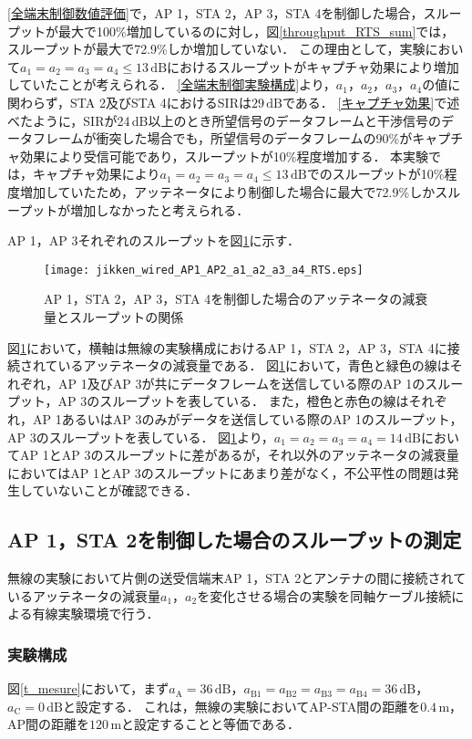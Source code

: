 \documentclass[master]{kuisthesis}		%
\begin{document}
\ref{全端末制御数値評価}で，AP 1，STA 2，AP 3，STA 4を制御した場合，スループットが最大で100\%増加しているのに対し，図\ref{throughput_RTS_sum}では，スループットが最大で72.9\%しか増加していない．
この理由として，実験において$a_1 = a_2 = a_3 = a_4 \leq 13\,\mathrm{dB}$におけるスループットがキャプチャ効果により増加していたことが考えられる．
\ref{全端末制御実験構成}より，$a_1$，$a_2$，$a_3$，$a_4$の値に関わらず，STA 2及びSTA 4におけるSIRは$29\,\mathrm{dB}$である．
\ref{キャプチャ効果}で述べたように，SIRが24\,dB以上のとき所望信号のデータフレームと干渉信号のデータフレームが衝突した場合でも，所望信号のデータフレームの90\%がキャプチャ効果により受信可能であり，スループットが10\%程度増加する．
本実験では，キャプチャ効果により$a_1 = a_2 = a_3 = a_4 \leq 13\,\mathrm{dB}$でのスループットが10\%程度増加していたため，アッテネータにより制御した場合に最大で72.9\%しかスループットが増加しなかったと考えられる．

AP 1，AP 3それぞれのスループットを図\ref{throughput_RTS}に示す．
\ifnum {}
\begin{figure}[!t]
\centering
\texttt{[image: jikken\_wired\_AP1\_AP2\_a1\_a2\_a3\_a4\_RTS.eps]}
\caption{AP 1，STA 2，AP 3，STA 4を制御した場合のアッテネータの減衰量とスループットの関係}
\label{throughput_RTS}
\end{figure}
\fi
図\ref{throughput_RTS}において，横軸は無線の実験構成におけるAP 1，STA 2，AP 3，STA 4に接続されているアッテネータの減衰量である．
図\ref{throughput_RTS}において，青色と緑色の線はそれぞれ，AP 1及びAP 3が共にデータフレームを送信している際のAP 1のスループット，AP 3のスループットを表している．
また，橙色と赤色の線はそれぞれ，AP 1あるいはAP 3のみがデータを送信している際のAP 1のスループット，AP 3のスループットを表している．
図\ref{throughput_RTS}より，$a_1 = a_2 = a_3 = a_4 = 14\,\mathrm{dB}$においてAP 1とAP 3のスループットに差があるが，それ以外のアッテネータの減衰量においてはAP 1とAP 3のスループットにあまり差がなく，不公平性の問題は発生していないことが確認できる．

\subsection{AP 1，STA 2を制御した場合のスループットの測定}\label{AP1，STA 2制御}
無線の実験において片側の送受信端末AP 1，STA 2とアンテナの間に接続されているアッテネータの減衰量$a_1$，$a_2$を変化させる場合の実験を同軸ケーブル接続による有線実験環境で行う．
\subsubsection{実験構成}\label{AP1STA2制御実験構成}
図\ref{t_mesure}において，まず$a_\mathrm{A} = 36\,\mathrm{dB}$，$a_\mathrm{B1} = a_\mathrm{B2} =a_\mathrm{B3} =a_\mathrm{B4} = 36\,\mathrm{dB}$，$a_\mathrm{C} = 0\,\mathrm{dB}$と設定する．
これは，無線の実験においてAP-STA間の距離を$0.4\,\mathrm{m}$，AP間の距離を$120\,\mathrm{m}$と設定することと等価である．
\end{document}
